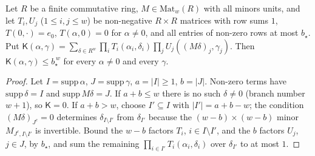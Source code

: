 \begin{lemma}\label{lem:D1}
Let $R$ be a finite commutative ring, $M\in\mathrm{Mat}_w(R)$ with all minors units, and let
$T_i,U_j$ ($1\le i,j\le w$) be non-negative $R\times R$ matrices with row sums $1$, $T(0,\cdot)=e_0$,
$T(\alpha,0)=0$ for $\alpha\ne0$, and all entries of non-zero rows at most $b_\star$. Put
$\mathsf K(\alpha,\gamma)=\sum_{\delta\in R^w}\prod_iT_i(\alpha_i,\delta_i)\prod_jU_j((M\delta)_j,\gamma_j)$. Then
$\mathsf K(\alpha,\gamma)\le b_\star^{\,w}$ for every $\alpha\ne0$ and every $\gamma$.
\end{lemma}
\begin{proof}
Let $I=\mathrm{supp}\,\alpha$, $J=\mathrm{supp}\,\gamma$, $a=|I|\ge1$, $b=|J|$. Non-zero terms have
$\mathrm{supp}\,\delta=I$ and $\mathrm{supp}\,M\delta=J$. If $a+b\le w$ there is no such $\delta\ne0$ (branch number $w+1$),
so $\mathsf K=0$. If $a+b>w$, choose $I'\subseteq I$ with $|I'|=a+b-w$; the condition $(M\delta)_{J^c}=0$ determines
$\delta_{I\setminus I'}$ from $\delta_{I'}$ because the $(w-b)\times(w-b)$ minor $M_{J^c,I\setminus I'}$ is invertible. Bound the
$w-b$ factors $T_i$, $i\in I\setminus I'$, and the $b$ factors $U_j$, $j\in J$, by $b_\star$, and sum the remaining
$\prod_{i\in I'}T_i(\alpha_i,\delta_i)$ over $\delta_{I'}$ to at most $1$.
\end{proof}

